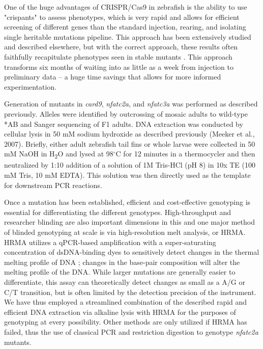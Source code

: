 One of the huge advantages of CRISPR/Cas9 in zebrafish is the ability to use "crispants" to assess phenotypes, which is very rapid and allows for efficient screening of different genes than the standard injection, rearing, and isolating single heritable mutations pipeline. This approach has been extensively studied and described elsewhere, but with the correct approach, these results often faithfully recapitulate phenotypes seen in stable mutants \citep{Zhang2017, Wu2018}. This approach transforms six months of waiting into as little as a week from injection to preliminary data -- a huge time savings that allows for more informed experimentation.

Generation of mutants in \textit{card9}, \textit{nfatc2a}, and \textit{nfatc3a} was performed as described previously. Alleles were identified by outcrossing of mosaic adults to wild-type *AB and Sanger sequencing of F1 adults. DNA extraction was conducted by cellular lysis in 50 mM sodium hydroxide as described previously (Meeker et al., 2007). Briefly, either adult zebrafish tail fins or whole larvae were collected in 50 mM NaOH in H\textsubscript{2}O and lysed at 98$^{\circ}$C for 12 minutes in a thermocycler and then neutralized by 1:10 addition of a solution of 1M Tris-HCl (pH 8) in 10x TE (100 mM Tris, 10 mM EDTA). This solution was then directly used as the template for downstream PCR reactions. 

Once a mutation has been established, efficient and cost-effective genotyping is essential for differentiating the different genotypes. High-throughput and researcher blinding are also important dimensions in this and one major method of blinded genotyping at scale is via high-resolution melt analysis, or HRMA. HRMA utilizes a qPCR-based amplification with a super-saturating concentration of dsDNA-binding dyes to sensitively detect changes in the thermal melting profile of DNA \citep{Reed2007, Thomas2014}; changes in the base-pair composition will alter the melting profile of the DNA. While larger mutations are generally easier to differentiate, this assay can theoretically detect changes as small as a A/G or C/T transition, but is often limited by the detection precision of the instrument. We have thus employed a streamlined combination of the described rapid and efficient DNA extraction via alkaline lysis \citep{Meeker2007} with HRMA for the purposes of genotyping at every possibility. Other methods are only utilized if HRMA has failed, thus the use of classical PCR and restriction digestion to genotype \textit{nfatc2a} mutants.

